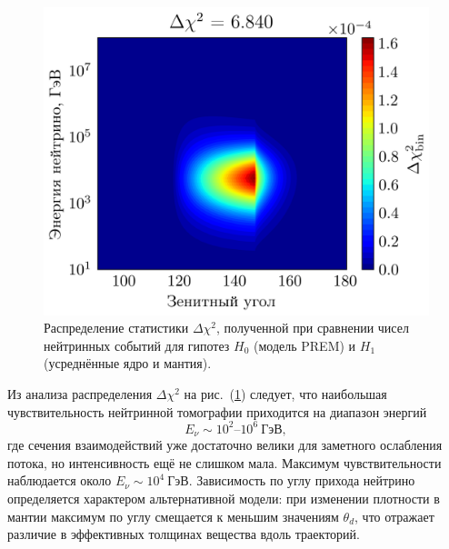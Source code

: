   \begin{figure}[!h]
    \centering
    \includegraphics[width=0.8\linewidth]{images/NuProp/chi2_rzf_2dxsCT10nlo_PREM_vs_PREM_man_and_ker.png}
    \caption{Распределение статистики $\Delta\chi^2$, полученной при сравнении чисел нейтринных событий для гипотез $H_0$ (модель PREM) и $H_1$ (усреднённые ядро и мантия).}
    \label{NuTom1}
  \end{figure}

Из анализа распределения $\Delta\chi^2$ на рис.~(\ref{NuTom1}) следует, что наибольшая чувствительность нейтринной томографии приходится на диапазон энергий  
\[
E_\nu \sim 10^2\text{–}10^6~\text{ГэВ},
\]
где сечения взаимодействий уже достаточно велики для заметного ослабления потока, но интенсивность ещё не слишком мала.  
Максимум чувствительности наблюдается около $E_\nu \sim 10^4~\text{ГэВ}$.  
Зависимость по углу прихода нейтрино определяется характером альтернативной модели: при изменении плотности в мантии максимум по углу смещается к меньшим значениям $\theta_d$, что отражает различие в эффективных толщинах вещества вдоль траекторий.
